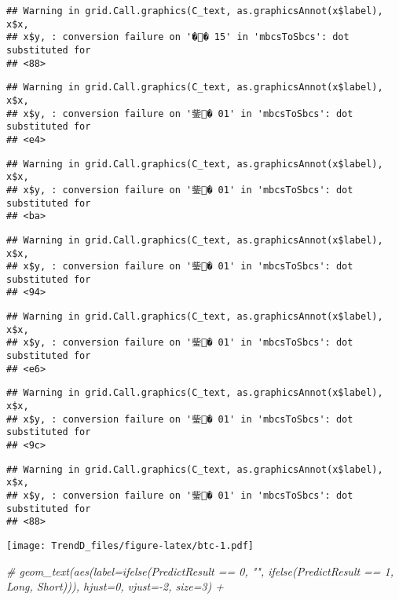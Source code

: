 \documentclass[]{article}
\newenvironment{Shaded}{\begin{snugshade}}{\end{snugshade}}
\newcommand{\CommentTok}[1]{\textcolor[rgb]{0.56,0.35,0.01}{\textit{#1}}}
\begin{document}
\begin{verbatim}
## Warning in grid.Call.graphics(C_text, as.graphicsAnnot(x$label), x$x,
## x$y, : conversion failure on '�� 15' in 'mbcsToSbcs': dot substituted for
## <88>
\end{verbatim}

\begin{verbatim}
## Warning in grid.Call.graphics(C_text, as.graphicsAnnot(x$label), x$x,
## x$y, : conversion failure on '鈭� 01' in 'mbcsToSbcs': dot substituted for
## <e4>
\end{verbatim}

\begin{verbatim}
## Warning in grid.Call.graphics(C_text, as.graphicsAnnot(x$label), x$x,
## x$y, : conversion failure on '鈭� 01' in 'mbcsToSbcs': dot substituted for
## <ba>
\end{verbatim}

\begin{verbatim}
## Warning in grid.Call.graphics(C_text, as.graphicsAnnot(x$label), x$x,
## x$y, : conversion failure on '鈭� 01' in 'mbcsToSbcs': dot substituted for
## <94>
\end{verbatim}

\begin{verbatim}
## Warning in grid.Call.graphics(C_text, as.graphicsAnnot(x$label), x$x,
## x$y, : conversion failure on '鈭� 01' in 'mbcsToSbcs': dot substituted for
## <e6>
\end{verbatim}

\begin{verbatim}
## Warning in grid.Call.graphics(C_text, as.graphicsAnnot(x$label), x$x,
## x$y, : conversion failure on '鈭� 01' in 'mbcsToSbcs': dot substituted for
## <9c>
\end{verbatim}

\begin{verbatim}
## Warning in grid.Call.graphics(C_text, as.graphicsAnnot(x$label), x$x,
## x$y, : conversion failure on '鈭� 01' in 'mbcsToSbcs': dot substituted for
## <88>
\end{verbatim}

\texttt{[image: TrendD\_files/figure-latex/btc-1.pdf]}

\begin{Shaded}
\begin{Highlighting}[]
  \CommentTok{# geom_text(aes(label=ifelse(PredictResult == 0, "", ifelse(PredictResult == 1, Long, Short))), hjust=0, vjust=-2, size=3) +}
\end{Highlighting}
\end{Shaded}
\end{document}
